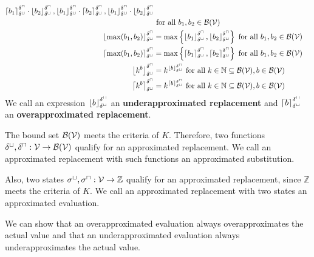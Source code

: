 \begin{definition}
\begin{align*}
{      \left\lceil b_1 \right\rceil^{\delta^\sqcap}_{\delta^\sqcup} \cdot \left\lfloor b_2 \right\rfloor^{\delta^\sqcap}_{\delta^\sqcup},
      \left\lfloor b_1 \right\rfloor^{\delta^\sqcap}_{\delta^\sqcup} \cdot \left\lceil b_2 \right\rceil^{\delta^\sqcap}_{\delta^\sqcup},
      \left\lfloor b_1 \right\rfloor^{\delta^\sqcap}_{\delta^\sqcup} \cdot \left\lfloor b_2 \right\rfloor^{\delta^\sqcap}_{\delta^\sqcup}
    } \\ & \text{ for all } b_1, b_2 \in \mathcal{B}(\mathcal{V}) \\
    \left\lfloor \max(b_1, b_2) \right\rfloor^{\delta^\sqcap}_{\delta^\sqcup} &= \max \left\lbrace \left\lfloor b_1 \right\rfloor^{\delta^\sqcap}_{\delta^\sqcup}, \left\lfloor b_2 \right\rfloor^{\delta^\sqcap}_{\delta^\sqcup} \right\rbrace \text{ for all } b_1, b_2 \in \mathcal{B}(\mathcal{V}) \\
    \left\lceil \max(b_1, b_2) \right\rceil^{\delta^\sqcap}_{\delta^\sqcup} &= \max \left\lbrace \left\lceil b_1 \right\rceil^{\delta^\sqcap}_{\delta^\sqcup}, \left\lceil b_2 \right\rceil^{\delta^\sqcap}_{\delta^\sqcup} \right\rbrace \text{ for all } b_1, b_2 \in \mathcal{B}(\mathcal{V}) \\
    \left\lfloor k^b \right\rfloor^{\delta^\sqcap}_{\delta^\sqcup} &= k^{\left\lfloor b \right\rfloor^{\delta^\sqcap}_{\delta^\sqcup}} \text{ for all } k \in \mathbb{N} \subseteq \mathcal{B}(\mathcal{V}), b \in \mathcal{B}(\mathcal{V}) \\
    \left\lceil k^b \right\rceil^{\delta^\sqcap}_{\delta^\sqcup} &= k^{\left\lceil b \right\rceil^{\delta^\sqcap}_{\delta^\sqcup}} \text{ for all } k \in \mathbb{N} \subseteq \mathcal{B}(\mathcal{V}), b \in \mathcal{B}(\mathcal{V}) \\
  \end{align*}
  We call an expression $\left\lfloor b \right\rfloor^{\delta^\sqcap}_{\delta^\sqcup}$ an \textbf{underapproximated replacement} and $\left\lceil b \right\rceil^{\delta^\sqcap}_{\delta^\sqcup}$ an \textbf{overapproximated replacement}.
\end{definition}

The bound set $\mathcal{B}(\mathcal{V})$ meets the criteria of $K$.
Therefore, two functions $\delta^\sqcup, \delta^\sqcap: \mathcal{V} \rightarrow \mathcal{B}(\mathcal{V})$ qualify for an approximated replacement.
We call an approximated replacement with such functions an approximated substitution.

Also, two states ${\sigma^\sqcup}, {\sigma^\sqcap}: \mathcal{V} \rightarrow \mathbb{Z}$ qualify for an approximated replacement, since $\mathbb{Z}$ meets the criteria of $K$.
We call an approximated replacement with two states an approximated evaluation.

We can show that an overapproximated evaluation always overapproximates the actual value and that an underapproximated evaluation always underapproximates the actual value.



